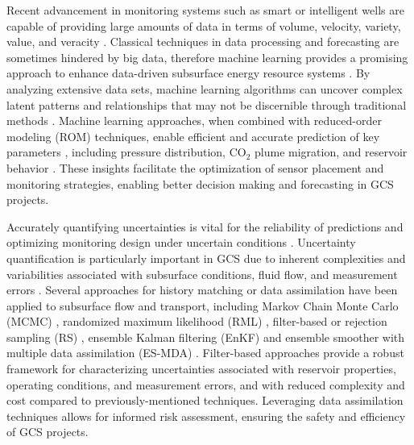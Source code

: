 \documentclass[a4paper,fleqn]{cas-sc}
\begin{document}
Recent advancement in monitoring systems such as smart or intelligent wells are capable of providing large amounts of data in terms of volume, velocity, variety, value, and veracity \citep{2021AGUFM.H25O1207S, tariq2021systematic, MIRZA202227}. Classical techniques in data processing and forecasting are sometimes hindered by big data, therefore machine learning provides a promising approach to enhance data-driven subsurface energy resource systems \citep{10.30632/SPWLA-2023-0084, pan2022, Laloy2018381, Liu2019725, Etienam2019}. By analyzing extensive data sets, machine learning algorithms can uncover complex latent patterns and relationships that may not be discernible through traditional methods \citep{Hassoun1995FundamentalsNetworks, Yegnanarayana2009ArtificialNetworks, Yeten2005, Chen2016, Babaei201619, Guo20182409, Ampomah201780, Wang2009506}. Machine learning approaches, when combined with reduced-order modeling (ROM) techniques, enable efficient and accurate prediction of key parameters \citep{Brunton2016SparseNLDynamics, FriesChoi2022LaSDI, HeChoi2023gLaSDI, Lucia2004Reduced-orderPhysics, Cardoso2009DevelopmentSimulationb, Zhu201956, Jin2020}, including pressure distribution, CO$_2$ plume migration, and reservoir behavior \citep{Wen2023Operators, Wen2021, Maldonado2021Unet, Razak2022, Kim2023}. These insights facilitate the optimization of sensor placement and monitoring strategies, enabling better decision making and forecasting in GCS projects.

Accurately quantifying uncertainties is vital for the reliability of predictions and optimizing monitoring design under uncertain conditions \citep{Zhu2018415, Wang2021, Mohamed201031, Chen2017328, Cremon2020, Bellenfant20092447, Sun2019, Li2011, Nordbotten2012234}. Uncertainty quantification is particularly important in GCS due to inherent complexities and variabilities associated with subsurface conditions, fluid flow, and measurement errors \citep{Jia2018104, Chen2020, Jeong20133771, Jayne2019128}. Several approaches for history matching or data assimilation have been applied to subsurface flow and transport, including Markov Chain Monte Carlo (MCMC) \citep{Emerick2012418, Liu2003188, Chen2016, Chen2017328, Cremon2020}, randomized maximum likelihood (RML) \citep{Chen20121}, filter-based or rejection sampling (RS) \citep{bhark2014assisted, park2013history, ma2008efficient, Caers2011}, ensemble Kalman filtering (EnKF) \citep{Chen2010579, Chang20108011, tavakoli2013comparison, dawuda2022geologic, Ma2019199} and ensemble smoother with multiple data assimilation (ES-MDA) \citep{Rafiee2017, Chen2020, jahandideh2021inference, tadjer2021managing, jiang2021data, liu20213d, misra2022deep}. Filter-based approaches provide a robust framework for characterizing uncertainties associated with reservoir properties, operating conditions, and measurement errors, and with reduced complexity and cost compared to previously-mentioned techniques. Leveraging data assimilation techniques allows for informed risk assessment, ensuring the safety and efficiency of GCS projects. 
\end{document}

